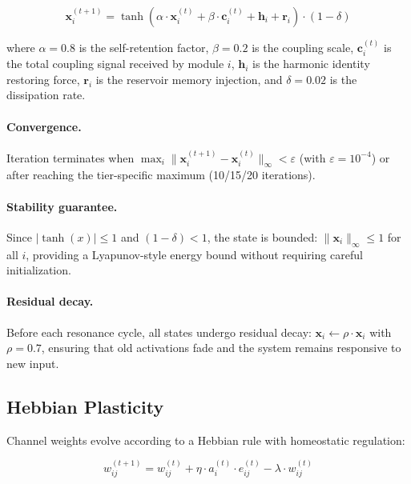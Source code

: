 \documentclass[11pt]{article}
\begin{document}
\begin{equation}
\mathbf{x}_i^{(t+1)} = \tanh\!\left(\alpha \cdot \mathbf{x}_i^{(t)} + \beta \cdot \mathbf{c}_i^{(t)} + \mathbf{h}_i + \mathbf{r}_i\right) \cdot (1 - \delta)
\label{eq:resonance}
\end{equation}

where $\alpha = 0.8$ is the self-retention factor, $\beta = 0.2$ is the coupling scale, $\mathbf{c}_i^{(t)}$ is the total coupling signal received by module $i$, $\mathbf{h}_i$ is the harmonic identity restoring force, $\mathbf{r}_i$ is the reservoir memory injection, and $\delta = 0.02$ is the dissipation rate.

\paragraph{Convergence.} Iteration terminates when $\max_i \|\mathbf{x}_i^{(t+1)} - \mathbf{x}_i^{(t)}\|_\infty < \varepsilon$ (with $\varepsilon = 10^{-4}$) or after reaching the tier-specific maximum (10/15/20 iterations).

\paragraph{Stability guarantee.} Since $|\tanh(x)| \leq 1$ and $(1-\delta) < 1$, the state is bounded: $\|\mathbf{x}_i\|_\infty \leq 1$ for all $i$, providing a Lyapunov-style energy bound without requiring careful initialization.

\paragraph{Residual decay.} Before each resonance cycle, all states undergo residual decay: $\mathbf{x}_i \leftarrow \rho \cdot \mathbf{x}_i$ with $\rho = 0.7$, ensuring that old activations fade and the system remains responsive to new input.

\subsection{Hebbian Plasticity}
\label{sec:plasticity}

Channel weights evolve according to a Hebbian rule with homeostatic regulation:

\begin{equation}
w_{ij}^{(t+1)} = w_{ij}^{(t)} + \eta \cdot a_i^{(t)} \cdot e_{ij}^{(t)} - \lambda \cdot w_{ij}^{(t)}
\label{eq:hebbian}
\end{equation}
\end{document}
